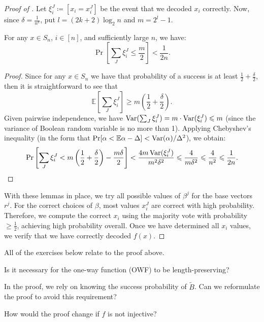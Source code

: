 \begin{proof}[Proof of ]
	Let $\xi_i^J \coloneqq [x_i = x_i^J]$ be the event that we decoded $x_i$ correctly.
	Now, since $\delta = \frac{1}{n^{k}}$, put $l = (2k + 2) \log_2 n$ and $m = 2^{l} - 1$.

	\begin{lemma}
	   For any $x \in S_n$, $i \in [n]$, and sufficiently large $n$, we have:
		\[
			\Pr\left[\sum_J \xi_i^J \leq \frac{m}{2}\right] < \frac{1}{2n}.
		\] 
	\end{lemma}

	\begin{proof}
		Since for any $x \in  S_n$ we have that probability of a success is at least $\frac{1}{2} + \frac{\delta}{2}$, then it is straightforward to see that
		\[
			\mathbb{E}\left[\sum_J \xi_i^J\right] \geq m\left(\frac{1}{2} + \frac{\delta}{2}\right).
		\]
		Given pairwise independence, we have $\operatorname{Var}(\sum_J \xi_i^J) = m \cdot \operatorname{Var}(\xi_i^J) \leqslant m$ (since the variance of Boolean random variable is no more than 1).
		Applying Chebyshev's inequality (in the form that $\Pr[\alpha < \mathbb{E} \alpha - \Delta] < \operatorname{Var}(\alpha) / \Delta^2$), we obtain:
		\[
			\Pr\left[\sum_J \xi_i^J < m\left(\frac{1}{2} + \frac{\delta}{2}\right) - \frac{m\delta}{2}\right] < \frac{4m \operatorname{Var}(\xi_i^J)}{m^2 \delta^2} \leqslant \frac{4}{m \delta^2} \leqslant \frac{4}{n^2} \leqslant \frac{1}{2n}.
		\] 
	\end{proof}

	With these lemmas in place, we try all possible values of $\beta^j$ for the base vectors $r^j$.
	For the correct choices of $\beta$, most values $x_i^J$ are correct with high probability.
	Therefore, we compute the correct $x_i$ using the majority vote with probability $\geq \frac{1}{2}$, achieving high probability overall.
	Once we have determined all $x_i$ values, we verify that we have correctly decoded $f(x)$.
\end{proof}

All of the exercises below relate to the proof above.

\begin{exercise}
    Is it necessary for the one-way function (OWF) to be length-preserving?
\end{exercise}

\begin{exercise}
    In the proof, we rely on knowing the success probability of $\tilde{B}$.
    Can we reformulate the proof to avoid this requirement?
\end{exercise}

\begin{exercise}
    How would the proof change if $f$ is not injective?
\end{exercise}

